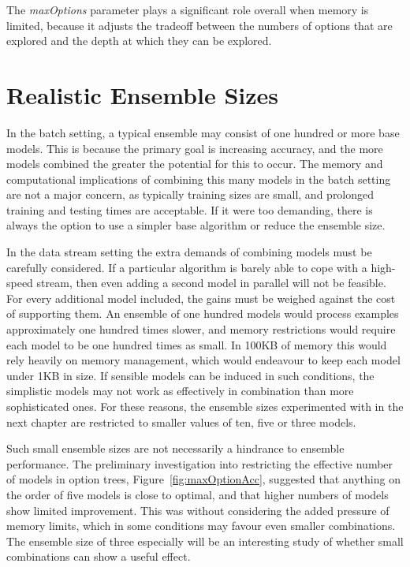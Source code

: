 The {\em maxOptions} parameter plays a significant role overall when memory is limited, because it adjusts the tradeoff between the numbers of options that are explored and the depth at which they can be explored. %

\section{Realistic Ensemble Sizes}
\label{sec:enssizes}

In the batch setting, a typical ensemble may consist of one hundred or more base models. This is because the primary goal is increasing accuracy, and the more models combined the greater the potential for this to occur. The memory and computational implications of combining this many models in the batch setting are not a major concern, as typically training sizes are small, and prolonged training and testing times are acceptable. If it were too demanding, there is always the option to use a simpler base algorithm or reduce the ensemble size.

In the data stream setting the extra demands of combining models must be carefully considered. If a particular algorithm is barely able to cope with a high-speed stream, then even adding a second model in parallel will not be feasible. For every additional model included, the gains must be weighed against the cost of supporting them. An ensemble of one hundred models would process examples approximately one hundred times slower, and memory restrictions would require each model to be one hundred times as small. In 100KB of memory this would rely heavily on memory management, which would endeavour to keep each model under 1KB in size. If sensible models can be induced in such conditions, the simplistic models may not work as effectively in combination than more sophisticated ones. For these reasons, the ensemble sizes experimented with in the next chapter are restricted to smaller values of ten, five or three models.

Such small ensemble sizes are not necessarily a hindrance to ensemble performance. The preliminary investigation into restricting the effective number of models in option trees, Figure~\ref{fig:maxOptionAcc}, suggested that anything on the order of five models is close to optimal, and that higher numbers of models show limited improvement. This was without considering the added pressure of memory limits, which in some conditions may favour even smaller combinations. The ensemble size of three especially will be an interesting study of whether small combinations can show a useful effect.

